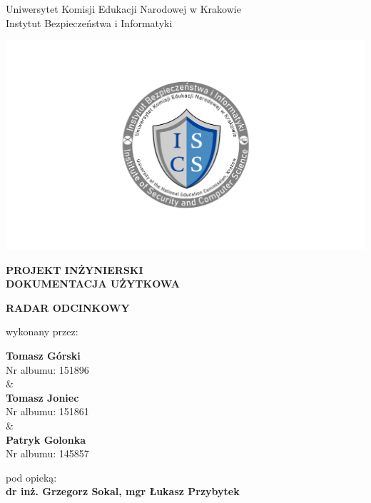 \documentclass[12pt,a4paper,oneside]{article}
\theoremstyle{definition}
\numberwithin{equation}{section}
\begin{document}

\thispagestyle{empty}
\begin{titlepage}
\begin{center}\Large
Uniwersytet Komisji Edukacji Narodowej w Krakowie\\
\large
Instytut Bezpieczeństwa i Informatyki\\
\vskip 10pt
\end{center}
\begin{center}
\centering \includegraphics[width=1.0\columnwidth]{images/logo.png}
\end{center}

\begin{center}
 {\bf \fontsize{14pt}{14pt}\selectfont PROJEKT INŻYNIERSKI\\ DOKUMENTACJA UŻYTKOWA}
\end{center}
\vskip 5pt
\begin{center}
 {\bf \fontsize{22pt}{22pt}\selectfont RADAR ODCINKOWY}
\end{center}

\begin{center}
 {\fontsize{12pt}{12pt}\selectfont wykonany przez: }
\end{center}
\begin{center}
 {\bf\fontsize{16pt}{16pt}\selectfont Tomasz Górski}\\
 {\fontsize{12pt}{12pt}\selectfont Nr albumu: 151896 \\\&\\}
 {\bf\fontsize{16pt}{16pt}\selectfont Tomasz Joniec}\\
 {\fontsize{12pt}{12pt}\selectfont Nr albumu: 151861\\\&\\}
 {\bf\fontsize{16pt}{16pt}\selectfont Patryk Golonka}\\
 {\fontsize{12pt}{12pt}\selectfont Nr albumu: 145857}
\end{center}
\begin{center}
 {\fontsize{12pt}{12pt}\selectfont pod opieką:}\\
 {\bf\fontsize{12pt}{12pt}\selectfont dr inż. Grzegorz Sokal, mgr Łukasz Przybytek}
\end{center}


\end{titlepage}
\end{document}
